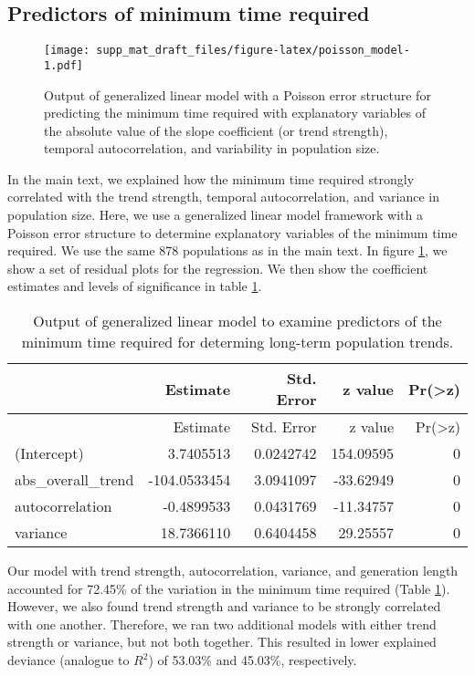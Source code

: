 \documentclass[12pt,]{article}
\begin{document}
\subsection{Predictors of minimum time
required}\label{predictors-of-minimum-time-required}

\begin{figure}[htbp]
\centering
\texttt{[image: supp\_mat\_draft\_files/figure-latex/poisson\_model-1.pdf]}
\caption{Output of generalized linear model with a Poisson error
structure for predicting the minimum time required with explanatory
variables of the absolute value of the slope coefficient (or trend
strength), temporal autocorrelation, and variability in population
size.\label{fig:poisson_model}}
\end{figure}

In the main text, we explained how the minimum time required strongly
correlated with the trend strength, temporal autocorrelation, and
variance in population size. Here, we use a generalized linear model
framework with a Poisson error structure to determine explanatory
variables of the minimum time required. We use the same 878 populations
as in the main text. In figure \ref{fig:poisson_model}, we show a set of
residual plots for the regression. We then show the coefficient
estimates and levels of significance in table \ref{table:model_output}.

\begin{longtable}[]{@{}lrrrr@{}}
\caption{Output of generalized linear model to examine predictors of the
minimum time required for determing long-term population
trends.\label{table:model_output}}\tabularnewline
\toprule
& Estimate & Std. Error & z value &
Pr(\textgreater{}\textbar{}z\textbar{})\tabularnewline
\midrule
\endfirsthead
\toprule
& Estimate & Std. Error & z value &
Pr(\textgreater{}\textbar{}z\textbar{})\tabularnewline
\midrule
\endhead
(Intercept) & 3.7405513 & 0.0242742 & 154.09595 & 0\tabularnewline
abs\_overall\_trend & -104.0533454 & 3.0941097 & -33.62949 &
0\tabularnewline
autocorrelation & -0.4899533 & 0.0431769 & -11.34757 & 0\tabularnewline
variance & 18.7366110 & 0.6404458 & 29.25557 & 0\tabularnewline
\bottomrule
\end{longtable}

Our model with trend strength, autocorrelation, variance, and generation
length accounted for 72.45\% of the variation in the minimum time
required (Table \ref{table:model_output}). However, we also found trend
strength and variance to be strongly correlated with one another.
Therefore, we ran two additional models with either trend strength or
variance, but not both together. This resulted in lower explained
deviance (analogue to \(R^2\)) of 53.03\% and 45.03\%, respectively.
\end{document}
